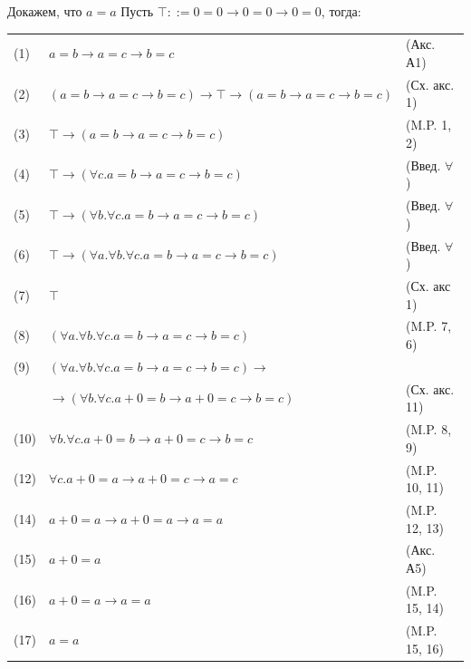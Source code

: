 \documentclass[aspectratio=169]{beamer}
\begin{document}
\begin{frame}{Докажем, что $a=a$}
\small
Пусть $\top ::= 0=0\to 0=0 \to 0=0$, тогда:\pause

\begin{tabular}{lll}
(1) & $a=b\to a=c \to b=c$ & (Акс. А1)\\
(2) & $(a=b\to a=c \to b=c) \to \top \to (a=b\to a=c \to b=c)$ & (Сх. акс. 1)\\
(3) & $\top \to (a=b\to a=c \to b=c)$ & (M.P. 1, 2)\\
(4) & $\top \to (\forall c.a = b\to a = c \to b = c)$ & (Введ. $\forall$)\\\pause
(5) & $\top \to (\forall b.\forall c.a = b\to a = c \to b = c)$ & (Введ. $\forall$)\\
(6) & $\top \to (\forall a.\forall b.\forall c.a = b\to a = c \to b = c)$ & (Введ. $\forall$)\\\pause
(7) & $\top$ & (Сх. акс 1)\\
(8) & $(\forall a.\forall b.\forall c.a = b\to a = c \to b = c)$ & (M.P. 7, 6)\\\pause
(9) & $(\forall a.\forall b.\forall c.a = b\to a = c \to b = c) \to $\\
    & $\to (\forall b.\forall c.a+0 = b\to a+0 = c \to b = c)$ & (Сх. акс. 11)\\\pause
(10) & $\forall b.\forall c.a+0 = b\to a+0 = c \to b = c$ & (M.P. 8, 9)\\\pause
(12) & $\forall c.a+0 = a\to a+0 = c \to a = c$ & (M.P. 10, 11)\\\pause
(14) & $a+0 = a\to a+0 = a \to a = a$ & (M.P. 12, 13)\\\pause
(15) & $a+0 = a$ & (Акс. А5)\\
(16) & $a+0 = a \to a = a$ & (M.P. 15, 14)\\
(17) & $a = a$ & (M.P. 15, 16)
\end{tabular}
\end{frame}
\end{document}
